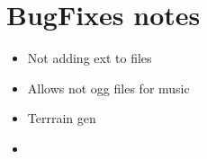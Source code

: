 \section{BugFixes notes}

\begin{itemize}
	\item Not adding ext to files
	\item Allows not ogg files for music
	\item Terrrain gen
	\item 
\end{itemize}